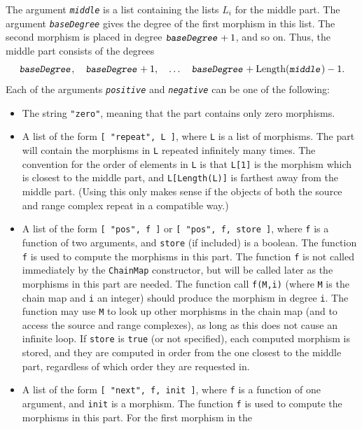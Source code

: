\documentclass[a4paper,11pt]{report}
\begin{document}
{{{ The argument \mbox{\texttt{\mdseries\slshape middle}} is a list containing the lists $L_i$ for the middle part. The argument \mbox{\texttt{\mdseries\slshape baseDegree}} gives the degree of the first morphism in this list. The second morphism is
placed in degree $\mbox{\texttt{\mdseries\slshape baseDegree}}+1$, and so on. Thus, the middle part consists of the degrees 
\[ \mbox{\texttt{\mdseries\slshape baseDegree}},\quad \mbox{\texttt{\mdseries\slshape baseDegree}} + 1,\quad \ldots\quad \mbox{\texttt{\mdseries\slshape baseDegree}} + \text{Length}(\mbox{\texttt{\mdseries\slshape middle}}) - 1. \]
 Each of the arguments \mbox{\texttt{\mdseries\slshape positive}} and \mbox{\texttt{\mdseries\slshape negative}} can be one of the following: 
\begin{itemize}
\item The string \texttt{"zero"}, meaning that the part contains only zero morphisms.
\item A list of the form \texttt{[ "repeat", L ]}, where \texttt{L} is a list of morphisms. The part will contain the morphisms in \texttt{L} repeated infinitely many times. The convention for the order of elements in \texttt{L} is that \texttt{L[1]} is the morphism which is closest to the middle part, and \texttt{L[Length(L)]} is farthest away from the middle part. (Using this only makes sense if the
objects of both the source and range complex repeat in a compatible way.)
\item A list of the form \texttt{[ "pos", f ]} or \texttt{[ "pos", f, store ]}, where \texttt{f} is a function of two arguments, and \texttt{store} (if included) is a boolean. The function \texttt{f} is used to compute the morphisms in this part. The function \texttt{f} is not called immediately by the \texttt{ChainMap} constructor, but will be called later as the morphisms in this part are
needed. The function call \texttt{f(M,i)} (where \texttt{M} is the chain map and \texttt{i} an integer) should produce the morphism in degree \texttt{i}. The function may use \texttt{M} to look up other morphisms in the chain map (and to access the source and
range complexes), as long as this does not cause an infinite loop. If \texttt{store} is \texttt{true} (or not specified), each computed morphism is stored, and they are computed in
order from the one closest to the middle part, regardless of which order they
are requested in.
\item A list of the form \texttt{[ "next", f, init ]}, where \texttt{f} is a function of one argument, and \texttt{init} is a morphism. The function \texttt{f} is used to compute the morphisms in this part. For the first morphism in the

\end{itemize}}}}
\end{document}
